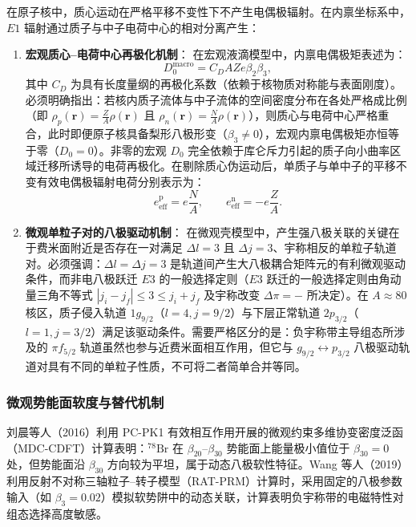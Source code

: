 在原子核中，质心运动在严格平移不变性下不产生电偶极辐射。在内禀坐标系中，$E1$ 辐射通过质子与中子电荷中心的相对分离产生：
\begin{enumerate}
\item \textbf{宏观质心--电荷中心再极化机制}：
在宏观液滴模型中，内禀电偶极矩表述为：
\begin{equation}\label{eq:4-5-myers-dipole}
D_0^{\text{macro}} = C_D A Z e \beta_2 \beta_3 ,
\end{equation}
其中 $C_D$ 为具有长度量纲的再极化系数（依赖于核物质对称能与表面刚度）。必须明确指出：若核内质子流体与中子流体的空间密度分布在各处严格成比例（即 $\rho_p(\mathbf{r}) = \frac{Z}{A}\rho(\mathbf{r})$ 且 $\rho_n(\mathbf{r}) = \frac{N}{A}\rho(\mathbf{r})$），则质心与电荷中心严格重合，此时即便原子核具备梨形八极形变（$\beta_3 \neq 0$），宏观内禀电偶极矩亦恒等于零（$D_0 = 0$）。非零的宏观 $D_0$ 完全依赖于库仑斥力引起的质子向小曲率区域迁移所诱导的电荷再极化。在剔除质心伪运动后，单质子与单中子的平移不变有效电偶极辐射电荷分别表示为：
\begin{equation}\label{eq:4-5-effective-charge}
e_{\text{eff}}^{\text{p}} = e \frac{N}{A}, \qquad e_{\text{eff}}^{\text{n}} = -e \frac{Z}{A}.
\end{equation}
\item \textbf{微观单粒子对的八极驱动机制}：
在微观壳模型中，产生强八极关联的关键在于费米面附近是否存在一对满足 $\Delta l = 3$ 且 $\Delta j = 3$、宇称相反的单粒子轨道对。必须强调：$\Delta l = \Delta j = 3$ 是轨道间产生大八极耦合矩阵元的有利微观驱动条件，而非电八极跃迁 $E3$ 的一般选择定则（$E3$ 跃迁的一般选择定则由角动量三角不等式 $|j_i - j_f| \le 3 \le j_i + j_f$ 及宇称改变 $\Delta\pi = -$ 所决定）。在 $A \approx 80$ 核区，质子侵入轨道 $1g_{9/2}$（$l=4, j=9/2$）与下层正常轨道 $2p_{3/2}$（$l=1, j=3/2$）满足该驱动条件。需要严格区分的是：负宇称带主导组态所涉及的 $\pi f_{5/2}$ 轨道虽然也参与近费米面相互作用，但它与 $g_{9/2} \leftrightarrow p_{3/2}$ 八极驱动轨道对具有不同的单粒子性质，不可将二者简单合并等同。
\end{enumerate}

\subsubsection{微观势能面软度与替代机制}

刘晨等人（2016）利用 PC-PK1 有效相互作用开展的微观约束多维协变密度泛函（MDC-CDFT）计算表明：$^{78}\mathrm{Br}$ 在 $\beta_{20}$--$\beta_{30}$ 势能面上能量极小值位于 $\beta_{30} = 0$ 处，但势能面沿 $\beta_{30}$ 方向较为平坦，属于动态八极软性特征。Wang 等人（2019）利用反射不对称三轴粒子--转子模型（RAT-PRM）计算时，采用固定的八极参数输入（如 $\beta_3 = 0.02$）模拟软势阱中的动态关联，计算表明负宇称带的电磁特性对组态选择高度敏感。

